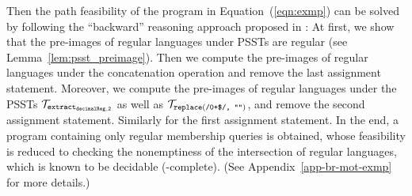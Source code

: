 Then the path feasibility of the program in Equation~(\ref{eqn:exmp}) can be solved by following the ``backward'' reasoning approach proposed in \cite{CHL+19}: At first, we show that the pre-images of regular languages under PSSTs are regular (see Lemma~\ref{lem:psst_preimage}). Then we compute the pre-images of regular languages under the concatenation operation and remove the last assignment statement. Moreover, we compute the pre-images of regular languages under the PSSTs $\mathcal{T}_{\tt extract_{decimalReg,2}}$ as well as $\mathcal{T}_{\scriptsize\tt replace(\mbox{\tt /0+\$/, ""})}$, and remove the second assignment statement. Similarly for the first assignment statement. In the end, a program containing only regular membership queries is obtained, whose feasibility is reduced to checking the nonemptiness of the intersection of regular languages, which is known to be decidable (\pspace-complete). (See Appendix~\ref{app-br-mot-exmp} for more details.)